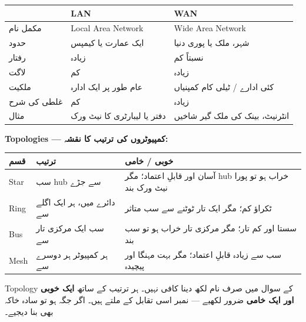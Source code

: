 \begin{hal}
\begin{center}
\begin{tabular}{@{}p{2.4cm} p{5.8cm} p{6.0cm}@{}}
\toprule
 & \textbf{\textenglish{LAN}} & \textbf{\textenglish{WAN}} \\
\midrule
مکمل نام & \textenglish{Local Area Network} & \textenglish{Wide Area Network} \\
حدود & ایک عمارت یا کیمپس & شہر، ملک یا پوری دنیا \\
رفتار & زیادہ & نسبتاً کم \\
لاگت & کم & زیادہ \\
ملکیت & عام طور پر ایک ادارہ & کئی ادارے / ٹیلی کام کمپنیاں \\
غلطی کی شرح & کم & زیادہ \\
مثال & دفتر یا لیبارٹری کا نیٹ ورک & انٹرنیٹ، بینک کی ملک گیر شاخیں \\
\bottomrule
\end{tabular}
\end{center}

\medskip
\textbf{\textenglish{Topologies} --- کمپیوٹروں کی ترتیب کا نقشہ:}
\begin{center}
\begin{tabular}{@{}p{2.4cm} p{5.2cm} p{6.6cm}@{}}
\toprule
\textbf{قسم} & \textbf{ترتیب} & \textbf{خوبی / خامی} \\
\midrule
\textenglish{Star} & سب \textenglish{hub} سے جڑے & آسان اور قابلِ اعتماد؛ مگر \textenglish{hub} خراب ہو تو پورا نیٹ ورک بند \\
\textenglish{Ring} & دائرے میں، ہر ایک اگلے سے & ٹکراؤ کم؛ مگر ایک تار ٹوٹنے سے سب متاثر \\
\textenglish{Bus} & سب ایک مرکزی تار سے & سستا اور کم تار؛ مگر مرکزی تار خراب ہو تو سب بند \\
\textenglish{Mesh} & ہر کمپیوٹر ہر دوسرے سے & سب سے زیادہ قابلِ اعتماد؛ مگر بہت مہنگا اور پیچیدہ \\
\bottomrule
\end{tabular}
\end{center}

\end{hal}

\begin{ghalti}
\textenglish{Topology} کے سوال میں صرف نام لکھ دینا کافی نہیں۔ ہر ترتیب کے ساتھ
\textbf{ایک خوبی اور ایک خامی} ضرور لکھیے --- نمبر اسی تقابل کے ملتے ہیں۔ اگر
جگہ ہو تو سادہ خاکہ بھی بنا دیجیے۔
\end{ghalti}

